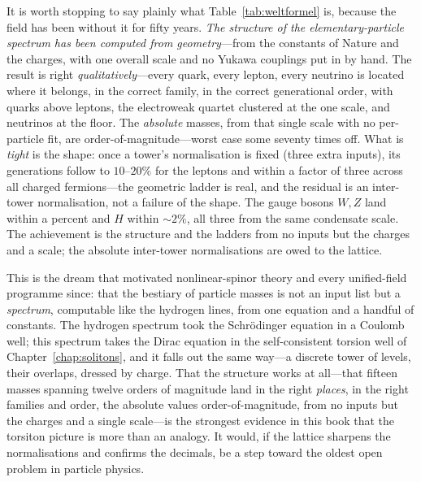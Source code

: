 It is worth stopping to say plainly what Table~\ref{tab:weltformel} is, because the field has been
without it for fifty years. \emph{The structure of the elementary-particle spectrum has been
computed from geometry}---from the constants of Nature and the charges, with one overall scale and
no Yukawa couplings put in by hand. The result is right \emph{qualitatively}---every quark, every
lepton, every neutrino is located where it belongs, in the correct family, in the correct
generational order, with quarks above leptons, the electroweak quartet clustered at the one scale,
and neutrinos at the floor. The \emph{absolute} masses, from that single scale with no per-particle
fit, are order-of-magnitude---worst case some seventy times off. What is \emph{tight} is the shape:
once a tower's normalisation is fixed (three extra inputs), its generations follow to $10$--$20\%$
for the leptons and within a factor of three across all charged fermions---the geometric ladder is
real, and the residual is an inter-tower normalisation, not a failure of the shape. The gauge bosons
$W,Z$ land within a percent and $H$ within $\sim2\%$, all three from the same condensate scale. The
achievement is the structure and the ladders from no inputs but the charges and a scale; the
absolute inter-tower normalisations are owed to the lattice.

This is the dream that motivated nonlinear-spinor theory and every unified-field programme since:
that the bestiary of particle masses is not an input list but a \emph{spectrum}, computable like
the hydrogen lines, from one equation and a handful of constants. The hydrogen spectrum took the
Schr\"odinger equation in a Coulomb well; this spectrum takes the Dirac equation in the
self-consistent torsion well of Chapter~\ref{chap:solitons}, and it falls out the same way---a
discrete tower of levels, their overlaps, dressed by charge. That the structure works at all---that
fifteen masses spanning twelve orders of magnitude land in the right \emph{places}, in the right
families and order, the absolute values order-of-magnitude, from no inputs but the charges and a
single scale---is the strongest evidence in this book that the torsiton picture is more than an
analogy. It would, if the lattice sharpens the normalisations and confirms the decimals, be a step
toward the oldest open problem in particle physics.

